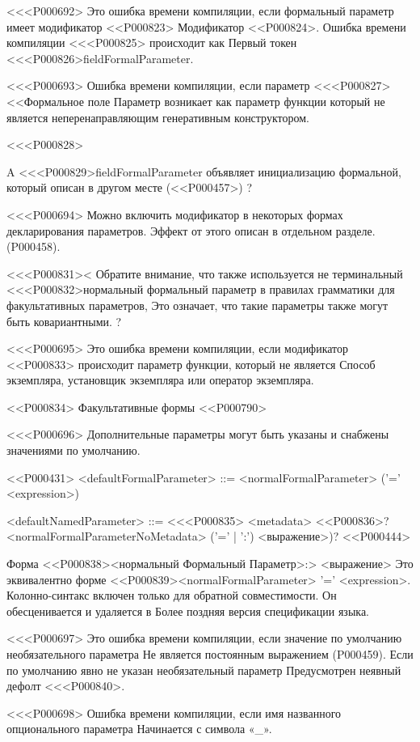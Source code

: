 <<<P000692>%
Это ошибка времени компиляции, если формальный параметр имеет модификатор <<P000823>
Модификатор <<P000824>.
Ошибка времени компиляции <<<P000825> происходит как
Первый токен <<<P000826>{fieldFormalParameter}.

<<<P000693>%
Ошибка времени компиляции, если параметр
<<<P000827><<Формальное поле Параметр возникает как параметр функции
который не является неперенаправляющим генеративным конструктором.

<<<P000828>{%
A <<<P000829>{fieldFormalParameter} объявляет инициализацию формальной,
который описан в другом месте
(<<P000457>)%
?

<<<P000694>%
Можно включить модификатор \COVARIANT{}
в некоторых формах декларирования параметров.
Эффект от этого описан в отдельном разделе.
(P000458).

<<<P000831><%
Обратите внимание, что также используется не терминальный <<<P000832>{нормальный формальный параметр}
в правилах грамматики для факультативных параметров,
Это означает, что такие параметры также могут быть ковариантными.
?

<<<P000695>%
Это ошибка времени компиляции, если модификатор <<P000833> происходит
параметр функции, который не является
Способ экземпляра, установщик экземпляра или оператор экземпляра.


<<P000834> Факультативные формы
<<P000790>

<<<P000696>%
Дополнительные параметры могут быть указаны и снабжены значениями по умолчанию.

<<P000431>
<defaultFormalParameter> ::= <normalFormalParameter> ('=' <expression>)

<defaultNamedParameter> ::= <<<P000835>
<metadata> <<P000836>? <normalFormalParameterNoMetadata>
\gnewline{}('=' | ':') <выражение>)?
<<P000444>

Форма <<P000838>{<нормальный Формальный Параметр>:> <выражение>}
Это эквивалентно форме
<<P000839>{<normalFormalParameter> '=' <expression>}.
Колонно-синтакс включен только для обратной совместимости.
Он обесценивается и удаляется в
Более поздняя версия спецификации языка.

<<<P000697>%
Это ошибка времени компиляции, если значение по умолчанию необязательного параметра
Не является постоянным выражением (P000459).
Если по умолчанию явно не указан необязательный параметр
Предусмотрен неявный дефолт <<<P000840>{}.

<<<P000698>%
Ошибка времени компиляции, если имя названного опционального параметра
Начинается с символа «_».

}
